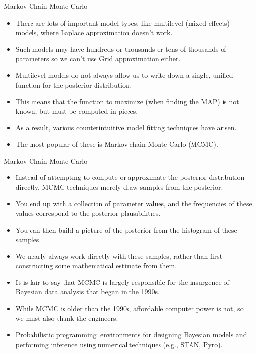 \documentclass[handout]{beamer}
\begin{document}
\begin{frame}{Markov Chain Monte Carlo}
\scriptsize{

\begin{itemize}
\item There are lots of important model types, like multilevel (mixed-effects) models, where Laplace approximation doesn't work.
\item Such models may have hundreds or thousands or tens-of-thousands of parameters so we can't use Grid approximation either.
\item Multilevel models do not always allow us to write down a single, unified function for the posterior distribution.
\item This means that the function to maximize (when finding the MAP) is not known, but must be computed in pieces. 
\item As a result, various counterintuitive model fitting techniques have arisen. 
\item The most popular of these is Markov chain Monte Carlo (MCMC).
\end{itemize}


} 
\end{frame}


\begin{frame}{Markov Chain Monte Carlo}
\scriptsize{

\begin{itemize}
\item Instead of attempting to compute or approximate the posterior distribution directly, MCMC techniques merely draw samples from the posterior.
\item You end up with a collection of parameter values, and the frequencies of these values correspond to the posterior plausibilities.
\item You can then build a picture of the posterior from the histogram of these samples.
\item We nearly always work directly with these samples, rather than first constructing some mathematical estimate from them.
\item It is fair to say that MCMC is largely responsible for the insurgence of Bayesian data analysis that began in the 1990s. 
\item While MCMC is older than the 1990s, affordable computer power is not, so we must also thank the engineers.
\item Probabilistic programming: environments for designing Bayesian models and performing inference using numerical techniques (e.g., STAN, Pyro).
\end{itemize}


} 
\end{frame}
\end{document}
